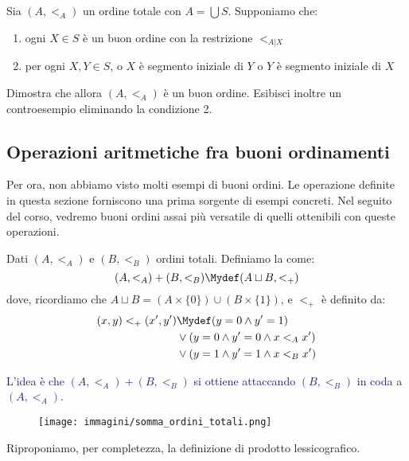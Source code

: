 \documentclass[11pt]{scrartcl}
\begin{document}
\begin{exercise}
	Sia $(A,<_A)$ un ordine totale con $A = \bigcup S$. Supponiamo che:
	\begin{enumerate}[1.]
		\item ogni $X \in S$ è un buon ordine con la restrizione $<_{A|X}$
		\item per ogni $X,Y \in S$, o $X$ è segmento iniziale di $Y$ o $Y$ è segmento iniziale di $X$
	\end{enumerate}
	Dimostra che allora $(A,<_A)$ è un buon ordine. Esibisci inoltre un controesempio eliminando la condizione 2.
\end{exercise}

\begin{soln}
	
\end{soln}

\subsection{Operazioni aritmetiche fra buoni ordinamenti}
Per ora, non abbiamo visto molti esempi di buoni ordini. Le operazione definite in questa sezione forniscono una prima sorgente di esempi concreti.
Nel seguito del corso, vedremo buoni ordini assai più versatile di quelli ottenibili con queste operazioni.

\begin{definition}
	Dati $(A,<_A)$ e $(B,<_B)$ ordini totali. Definiamo la  come:
	\[ (A,<_A) + (B,<_B) \Mydef (A \sqcup B, <_+)
		\]
	dove, ricordiamo che $A \sqcup B = (A \times\{0\}) \cup (B \times \{1\})$, e $<_+$ è definito da:
	\[ \begin{split}
		(x,y) <_+ (x',y') &\Mydef (y = 0 \land y' = 1) \\
						  &\lor (y = 0 \land y' = 0 \land x <_A x') \\
						  &\lor (y = 1 \land y' = 1 \land x <_B x')
	\end{split}
		\]
\end{definition}

\textcolor{MidnightBlue}{L'idea è che $(A,<_A) + (B,<_B)$ si ottiene attaccando $(B,<_B)$ in coda a $(A,<_A)$}.

\begin{figure}[H]
	\centering
	\texttt{[image: immagini/somma\_ordini\_totali.png]}
\end{figure}

Riproponiamo, per completezza, la definizione di prodotto lessicografico.
\end{document}
